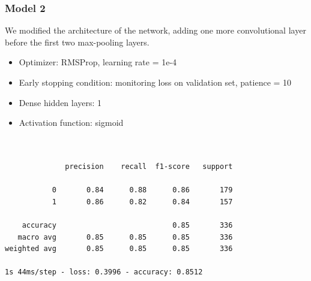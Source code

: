 \documentclass{article}
\begin{document}
\subsubsection{Model 2}
We modified the architecture of the network, adding one more convolutional layer before the first two max-pooling layers.

\begin{itemize}
\item Optimizer: RMSProp, learning rate = 1e-4
\item Early stopping condition: monitoring loss on validation set, patience = 10
\item Dense hidden layers: 1
\item Activation function: sigmoid
\end{itemize}

\begin {verbatim}


              precision    recall  f1-score   support

           0       0.84      0.88      0.86       179
           1       0.86      0.82      0.84       157

    accuracy                           0.85       336
   macro avg       0.85      0.85      0.85       336
weighted avg       0.85      0.85      0.85       336

1s 44ms/step - loss: 0.3996 - accuracy: 0.8512

\end{verbatim}
\end{document}
